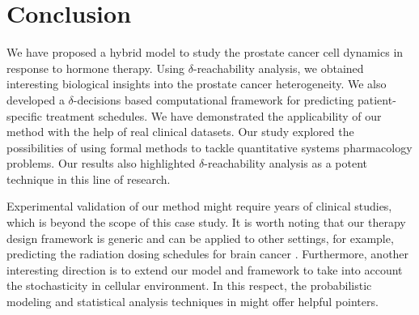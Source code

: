 \section{Conclusion}
\label{sec:Conclusion}

We have proposed a hybrid model to study the prostate cancer cell dynamics in response to hormone therapy. Using $\delta$-reachability analysis, we obtained interesting biological insights into the prostate cancer heterogeneity. We also developed a $\delta$-decisions based computational framework for predicting patient-specific treatment schedules. We have demonstrated the applicability of our method with the help of real clinical datasets. Our study explored the possibilities of using formal methods to tackle quantitative systems pharmacology problems. Our results also highlighted $\delta$-reachability analysis as a potent technique in this line of research. 

Experimental validation of our method might require years of clinical studies, which is beyond the scope of this case study. It is worth noting that our therapy design framework is generic and can be applied to other settings, for example, predicting the radiation dosing schedules for brain cancer \cite{leder14}. Furthermore, another interesting direction is to extend our model and framework to take into account the stochasticity in cellular environment. In this respect, the probabilistic modeling and statistical analysis techniques in \cite{liu11,liu13,liu12bioinfo} might offer helpful pointers.
